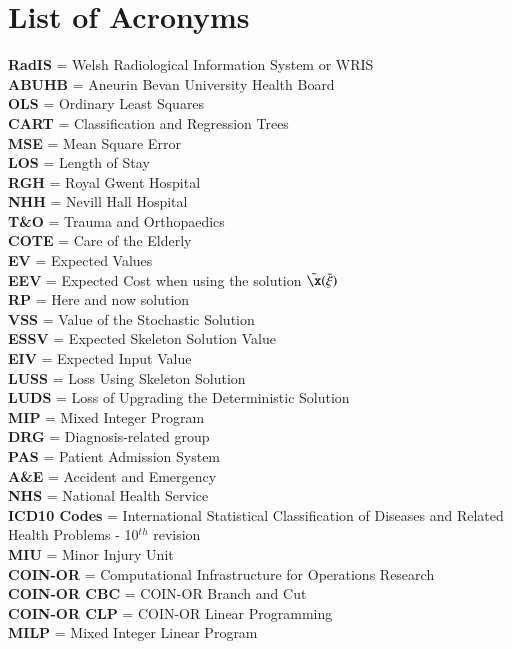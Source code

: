 \documentclass[../thesis.tex]{subfiles}
\begin{document}
\chapter*{\textbf{List of Acronyms}}
\textbf{RadIS} = Welsh Radiological Information System or WRIS\\
\textbf{ABUHB} = Aneurin Bevan University Health Board\\
\textbf{OLS} = Ordinary Least Squares\\
\textbf{CART} = Classification and Regression Trees\\
\textbf{MSE} = Mean Square Error\\
\textbf{LOS} = Length of Stay\\
\textbf{RGH} = Royal Gwent Hospital\\
\textbf{NHH} = Nevill Hall Hospital\\
\textbf{T\&O} = Trauma and Orthopaedics\\
\textbf{COTE} = Care of the Elderly \\
\textbf{EV} = Expected Values\\
\textbf{EEV} = Expected Cost when using the solution $\bar \x(\bar \xi)$\\ 
\textbf{RP} = Here and now solution\\
\textbf{VSS} = Value of the Stochastic Solution\\
\textbf{ESSV} = Expected Skeleton Solution Value\\
\textbf{EIV} = Expected Input Value\\
\textbf{LUSS} = Loss Using Skeleton Solution\\
\textbf{LUDS} = Loss of Upgrading the Deterministic Solution\\
\textbf{MIP} = Mixed Integer Program\\
\textbf{DRG} = Diagnosis-related group\\
\textbf{PAS} = Patient Admission System\\
\textbf{A\&E} = Accident and Emergency\\
\textbf{NHS} = National Health Service\\
\textbf{ICD10 Codes} = International Statistical Classification of Diseases and Related Health Problems - 10$^{th}$ revision\\
\textbf{MIU }= Minor Injury Unit\\
\textbf{COIN-OR }= Computational Infrastructure for Operations Research\\
\textbf{COIN-OR CBC} = COIN-OR Branch and Cut\\
\textbf{COIN-OR CLP} = COIN-OR Linear Programming\\
\textbf{MILP} = Mixed Integer Linear Program\\
\end{document}
